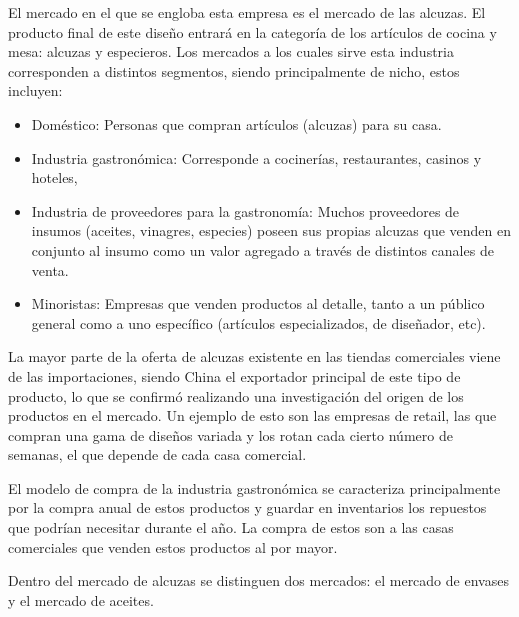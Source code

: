 El mercado en el que se engloba esta empresa es el mercado de las alcuzas. El producto final de este diseño entrará en la categoría de los artículos de cocina y mesa: alcuzas y especieros. Los mercados a los cuales sirve esta industria corresponden a distintos segmentos, siendo principalmente de nicho, estos incluyen:
\begin{itemize}
\item Doméstico: Personas que compran artículos (alcuzas) para su casa.
\item Industria gastronómica: Corresponde a cocinerías, restaurantes, casinos y hoteles,
\item Industria de proveedores para la gastronomía: Muchos proveedores de insumos (aceites, vinagres, especies) poseen sus propias alcuzas que venden en conjunto al insumo como un valor agregado a través de distintos canales de venta.
\item Minoristas: Empresas que venden productos al detalle, tanto a un público general como a uno específico (artículos especializados, de diseñador, etc).
\end{itemize}

La mayor parte de la oferta de alcuzas existente en las tiendas comerciales viene de las importaciones, siendo China el exportador principal de este tipo de producto, lo que se confirmó realizando una investigación del origen de los productos en el mercado. Un ejemplo de esto son las empresas de retail, las que compran una gama de diseños variada y los rotan cada cierto número de semanas, el que depende de cada casa comercial.

El modelo de compra de la industria gastronómica se caracteriza principalmente por la compra anual de estos productos y guardar en inventarios los repuestos que podrían necesitar durante el año. La compra de estos son a las casas comerciales que venden estos productos al por mayor.

Dentro del mercado de alcuzas se distinguen dos mercados: el mercado de envases y el mercado de aceites.

